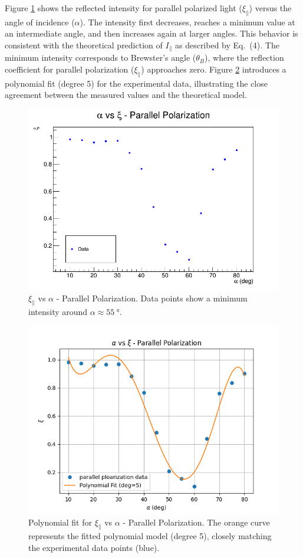 \documentclass[journal]{IEEEtran}
\begin{document}
Figure \ref{fig:parallel} shows the reflected intensity for parallel polarized light ($\xi_{\parallel}$) versus the angle of incidence ($\alpha$). The intensity first decreases, reaches a minimum value at an intermediate angle, and then increases again at larger angles. This behavior is consistent with the theoretical prediction of $I_{\parallel}$ as described by Eq.~(4). The minimum intensity corresponds to Brewster's angle ($\theta_B$), where the reflection coefficient for parallel polarization ($\xi_{\parallel}$) approaches zero. Figure \ref{fig:polynomial_fit} introduces a polynomial fit (degree 5) for the experimental data, illustrating the close agreement between the measured values and the theoretical model.

\begin{figure}[H]
    \centering
    \includegraphics[width=\linewidth]{../plots/parallel_plot.png}
    \caption{$\xi_{\parallel}$ vs $\alpha$ - Parallel Polarization. Data points show a minimum intensity around $\alpha \approx \SI{55}{\degree}$.}
    \label{fig:parallel}
\end{figure}
\begin{figure}[H]
    \centering
    \includegraphics[width=\linewidth]{../plots/polynomial_fit.png}
    \caption{Polynomial fit for $\xi_{\parallel}$ vs $\alpha$ - Parallel Polarization. The orange curve represents the fitted polynomial model (degree 5), closely matching the experimental data points (blue).}
    \label{fig:polynomial_fit}
\end{figure}
\end{document}
